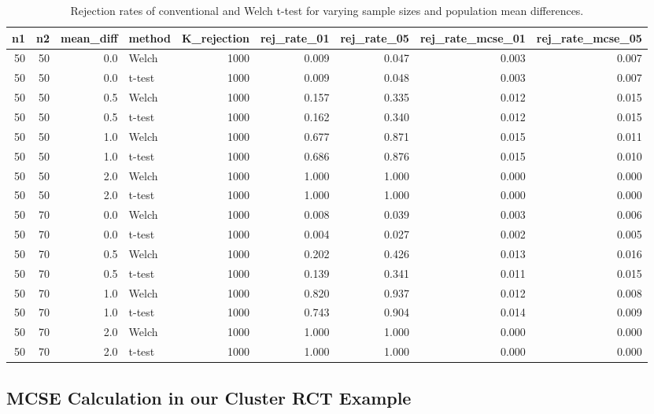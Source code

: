 \documentclass[
]{book}
\begin{document}
\begin{table}
\centering
\caption{\label{tab:Welch-rejection}Rejection rates of conventional and Welch t-test for varying sample sizes and population mean differences.}
\centering
\begin{tabular}[t]{r|r|r|l|r|r|r|r|r}
\hline
n1 & n2 & mean\_diff & method & K\_rejection & rej\_rate\_01 & rej\_rate\_05 & rej\_rate\_mcse\_01 & rej\_rate\_mcse\_05\\
\hline
50 & 50 & 0.0 & Welch & 1000 & 0.009 & 0.047 & 0.003 & 0.007\\
\hline
50 & 50 & 0.0 & t-test & 1000 & 0.009 & 0.048 & 0.003 & 0.007\\
\hline
50 & 50 & 0.5 & Welch & 1000 & 0.157 & 0.335 & 0.012 & 0.015\\
\hline
50 & 50 & 0.5 & t-test & 1000 & 0.162 & 0.340 & 0.012 & 0.015\\
\hline
50 & 50 & 1.0 & Welch & 1000 & 0.677 & 0.871 & 0.015 & 0.011\\
\hline
50 & 50 & 1.0 & t-test & 1000 & 0.686 & 0.876 & 0.015 & 0.010\\
\hline
50 & 50 & 2.0 & Welch & 1000 & 1.000 & 1.000 & 0.000 & 0.000\\
\hline
50 & 50 & 2.0 & t-test & 1000 & 1.000 & 1.000 & 0.000 & 0.000\\
\hline
50 & 70 & 0.0 & Welch & 1000 & 0.008 & 0.039 & 0.003 & 0.006\\
\hline
50 & 70 & 0.0 & t-test & 1000 & 0.004 & 0.027 & 0.002 & 0.005\\
\hline
50 & 70 & 0.5 & Welch & 1000 & 0.202 & 0.426 & 0.013 & 0.016\\
\hline
50 & 70 & 0.5 & t-test & 1000 & 0.139 & 0.341 & 0.011 & 0.015\\
\hline
50 & 70 & 1.0 & Welch & 1000 & 0.820 & 0.937 & 0.012 & 0.008\\
\hline
50 & 70 & 1.0 & t-test & 1000 & 0.743 & 0.904 & 0.014 & 0.009\\
\hline
50 & 70 & 2.0 & Welch & 1000 & 1.000 & 1.000 & 0.000 & 0.000\\
\hline
50 & 70 & 2.0 & t-test & 1000 & 1.000 & 1.000 & 0.000 & 0.000\\
\hline
\end{tabular}
\end{table}

\subsection{MCSE Calculation in our Cluster RCT Example}\label{mcse-calculation-in-our-cluster-rct-example}
\end{document}

